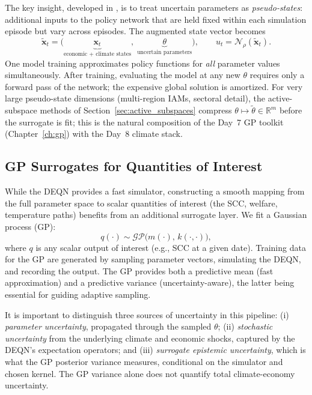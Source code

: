 \documentclass[11pt,a4paper]{report}
\begin{document}
The key insight, developed in \citet{friedlDeep2023}, is to treat uncertain parameters as \emph{pseudo-states}: additional inputs to the policy network that are held fixed within each simulation episode but vary across episodes.  The augmented state vector becomes
\begin{equation}
\tilde{\bm{x}}_t = \bigl(\underbrace{\bm{x}_t}_{\text{economic + climate states}},\; \underbrace{\theta}_{\text{uncertain parameters}}\bigr),
\qquad u_t = \mathcal{N}_\rho(\tilde{\bm{x}}_t).
\label{eq:pseudo_state}
\end{equation}
One model training approximates policy functions for \emph{all} parameter values simultaneously.  After training, evaluating the model at any new $\theta$ requires only a forward pass of the network; the expensive global solution is amortized.  For very large pseudo-state dimensions (multi-region IAMs, sectoral detail), the active-subspace methods of Section~\ref{sec:active_subspaces} compress $\theta \mapsto \tilde\theta \in \mathbb{R}^m$ before the surrogate is fit; this is the natural composition of the Day~7 GP toolkit (Chapter~\ref{ch:gp}) with the Day~8 climate stack.

\subsection{GP Surrogates for Quantities of Interest}

While the DEQN provides a fast simulator, constructing a smooth mapping from the full parameter space to scalar quantities of interest (the SCC, welfare, temperature paths) benefits from an additional surrogate layer.  We fit a Gaussian process (GP):
\begin{equation}
q(\cdot) \sim \mathcal{GP}\bigl(m(\cdot),\, k(\cdot, \cdot)\bigr),
\end{equation}
where $q$ is any scalar output of interest (e.g., SCC at a given date).  Training data for the GP are generated by sampling parameter vectors, simulating the DEQN, and recording the output.  The GP provides both a predictive mean (fast approximation) and a predictive variance (uncertainty-aware), the latter being essential for guiding adaptive sampling.

It is important to distinguish three sources of uncertainty in this pipeline: (i) \emph{parameter uncertainty}, propagated through the sampled $\theta$; (ii) \emph{stochastic uncertainty} from the underlying climate and economic shocks, captured by the DEQN's expectation operators; and (iii) \emph{surrogate epistemic uncertainty}, which is what the GP posterior variance measures, conditional on the simulator and chosen kernel.  The GP variance alone does not quantify total climate-economy uncertainty.
\end{document}
